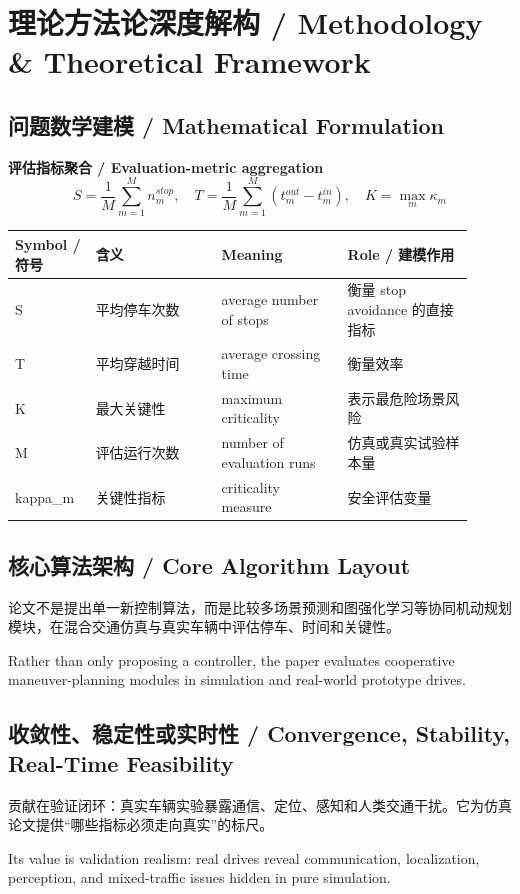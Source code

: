 \documentclass[UTF8,a4paper,11pt,fontset=fandol]{ctexart}
\begin{document}
\section{理论方法论深度解构 / Methodology \& Theoretical Framework}
\subsection{问题数学建模 / Mathematical Formulation}
\textbf{评估指标聚合 / Evaluation-metric aggregation}
\[
S=\frac{1}{M}\sum_{m=1}^{M} n_m^{stop},\quad T=\frac{1}{M}\sum_{m=1}^{M}(t_m^{out}-t_m^{in}),\quad K=\max_m \kappa_m
\]
\begin{longtable}{p{0.16\linewidth}p{0.25\linewidth}p{0.25\linewidth}p{0.25\linewidth}}
\toprule
Symbol / 符号 & 含义 & Meaning & Role / 建模作用\\
\midrule
S & 平均停车次数 & average number of stops & 衡量 stop avoidance 的直接指标 \\
T & 平均穿越时间 & average crossing time & 衡量效率 \\
K & 最大关键性 & maximum criticality & 表示最危险场景风险 \\
M & 评估运行次数 & number of evaluation runs & 仿真或真实试验样本量 \\
kappa\_m & 关键性指标 & criticality measure & 安全评估变量 \\
\bottomrule
\end{longtable}

\subsection{核心算法架构 / Core Algorithm Layout}
论文不是提出单一新控制算法，而是比较多场景预测和图强化学习等协同机动规划模块，在混合交通仿真与真实车辆中评估停车、时间和关键性。

Rather than only proposing a controller, the paper evaluates cooperative maneuver-planning modules in simulation and real-world prototype drives.

\subsection{收敛性、稳定性或实时性 / Convergence, Stability, Real-Time Feasibility}
贡献在验证闭环：真实车辆实验暴露通信、定位、感知和人类交通干扰。它为仿真论文提供“哪些指标必须走向真实”的标尺。

Its value is validation realism: real drives reveal communication, localization, perception, and mixed-traffic issues hidden in pure simulation.
\end{document}
